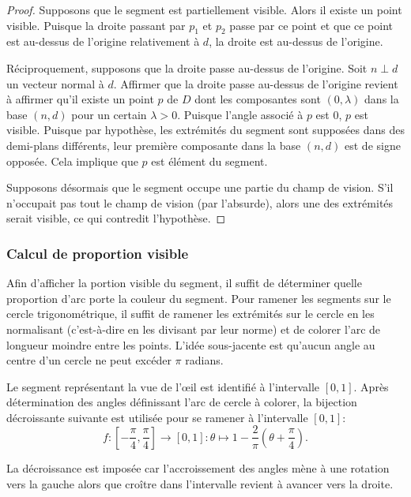 \begin{proof}
  Supposons que le segment est partiellement visible. Alors il existe
  un point visible. Puisque la droite passant par $p_1$ et $p_2$ passe
  par ce point et que ce point est au-dessus de l'origine relativement
  à $d$, la droite est au-dessus de l'origine.


  Réciproquement, supposons que la droite passe au-dessus de l'origine.
  Soit $n\perp d$ un vecteur normal à $d$. Affirmer que la droite passe
  au-dessus de l'origine revient à affirmer qu'il existe un point $p$ de $D$
  dont les composantes sont $(0, \lambda)$ dans la base $(n, d)$ pour
  un certain $\lambda>0$. Puisque l'angle associé à $p$ est $0$, $p$
  est visible. Puisque par hypothèse, les extrémités du segment sont
  supposées dans des demi-plans différents, leur première composante
  dans la base $(n, d)$ est de signe opposée. Cela implique que $p$
  est élément du segment.

  Supposons désormais que le segment occupe une partie du champ de vision.
  S'il n'occupait pas tout le champ de vision (par l'absurde), alors
  une des extrémités serait visible, ce qui contredit l'hypothèse.
\end{proof}

\subsubsection{Calcul de proportion visible}
Afin d'afficher la portion visible du segment,
il suffit de déterminer quelle proportion d'arc  porte la couleur du segment.
Pour ramener les segments sur le cercle trigonométrique, il suffit
de ramener les extrémités sur le cercle en les normalisant (c'est-à-dire en
les divisant par leur norme) et
de colorer l'arc de longueur moindre entre les points.
L'idée sous-jacente est qu'aucun angle au centre d'un cercle ne
peut excéder $\pi$ radians.


Le segment représentant la vue de l'\oe{}il est identifié à l'intervalle
$[0, 1]$. Après détermination des angles définissant l'arc de cercle
à colorer, la bijection décroissante suivante est utilisée pour
se ramener à l'intervalle $[0, 1]$:
$$f:\left[-\frac{\pi}{4}, \frac{\pi}{4}\right]\to [0, 1]: \theta \mapsto 1 - \frac{2}{\pi}\left(\theta + \frac{\pi}{4}\right).$$

La décroissance est imposée car l'accroissement des angles mène
à une rotation vers la gauche alors que croître dans l'intervalle
revient à avancer vers la droite.

